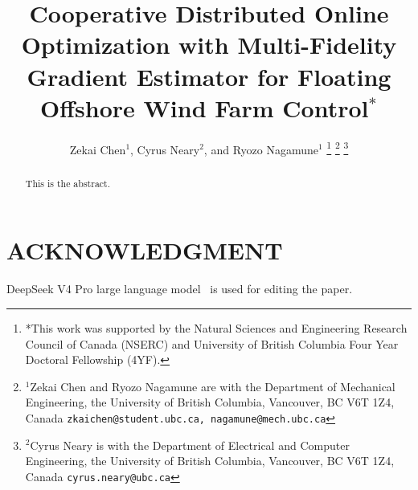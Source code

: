 \documentclass[letterpaper, 10 pt, conference]{ieeeconf}
\title{\LARGE \bf Cooperative Distributed Online Optimization with Multi-Fidelity Gradient Estimator for Floating Offshore Wind Farm Control$^{*}$}
\author{Zekai Chen$^{1}$, Cyrus Neary$^{2}$, and Ryozo Nagamune$^{1}$%
\thanks{*This work was supported by the Natural Sciences and Engineering
Research Council of Canada (NSERC) and University of British Columbia Four Year Doctoral Fellowship (4YF).}%
\thanks{$^{1}$Zekai Chen and Ryozo Nagamune are with the Department of Mechanical Engineering, the University of British Columbia, Vancouver, BC V6T 1Z4, Canada {\tt\small zkaichen@student.ubc.ca, nagamune@mech.ubc.ca}}%
\thanks{$^{2}$Cyrus Neary is with the Department of Electrical and Computer Engineering, the University of British Columbia, Vancouver, BC V6T 1Z4, Canada {\tt\small cyrus.neary@ubc.ca}}}%
\begin{document}
\maketitle
\thispagestyle{empty}
\pagestyle{empty}

\begin{abstract}
This is the abstract.
\end{abstract}







\section*{ACKNOWLEDGMENT}
DeepSeek V4 Pro large language model~\cite{deepseek} is used for editing the paper.



\end{document}
